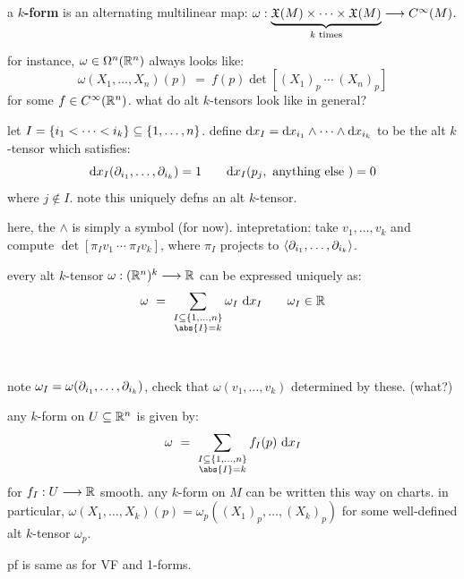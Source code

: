 \begin{defn}[title=Functional]
	a $k$\textbf{-form} is an alternating multilinear map:
	$\omega:\underbrace{\mathfrak{X}(M)\times\cdots\times\mathfrak{X}(M)}_{k \textrm{ times}}\longrightarrow C^{\infty}(M)$.
\end{defn}
for instance, $\omega\in\Omega^{n}(\mathbb{R}^{n})$ always looks like:
\begin{equation*}
	\omega(X_{1},\dots,X_{n})(p) \ = \ f(p)\det[(X_{1})_{p} \ \cdots \ (X_{n})_{p}]
\end{equation*}
for some $f\in C^{\infty}(\mathbb{R}^{n})$.
what do alt $k$-tensors look like in general?

\begin{defn}
	let $I=\left\{{i_{1}<\dots<i_{k}}\right\}\subseteq\left\{{1,\dots,n}\right\}$.
	define $\textrm{d} x_{I}=\textrm{d} x_{i_{1}}\wedge\cdots\wedge \textrm{d} x_{i_{k}}$
	to be the alt $k$-tensor which satisfies:
	\begin{equation*}
		\textrm{d} x_{I}(\partial_{i_{1}},\dots,\partial_{i_{k}}) = 1 \qquad
		\textrm{d} x_{I}(p_{j},\textrm{ anything else }) = 0
	\end{equation*}
	where $j\notin I$. note this uniquely defns an alt $k$-tensor.
\end{defn}
here, the $\wedge$ is simply a symbol (for now).
intepretation: take $v_{1},\dots,v_{k}$ and compute
$\det[\pi_{I}v_{1} \ \cdots \ \pi_{I}v_{k}]$, where $\pi_{I}$ projects
to $\left\langle{\partial_{i_{1}},\dots,\partial_{i_{k}}}\right\rangle$.

\begin{lm}[title=Coordinate-wise]
	every alt $k$-tensor $\omega:(\mathbb{R}^{n})^{k}\longrightarrow\mathbb{R}$ can be expressed
	uniquely as:
	\begin{equation*}
		\omega \ = \ \sum_{\substack{I\subseteq\set{1,\dots,n}\\\abs{I}=k}}\omega_{I}\di x_{I} \qquad
		\omega_{I}\in\bR
	\end{equation*} \vspace{-0.3in}
\end{lm} \

\begin{pf}
	note $\omega_{I}=\omega(\partial_{i_{1}},\dots,\partial_{i_{k}})$,
	check that $\omega(v_{1},\dots,v_{k})$ determined by these. (what?)
\end{pf}

\begin{prop}
	any $k$-form on $U\subseteq\mathbb{R}^{n}$ is given by:
	\begin{equation*}
		\omega \ = \ \sum_{\substack{I\subseteq\set{1,\dots,n}\\\abs{I}=k}}
		f_{I}(p)\di x_{I}
	\end{equation*}
	for $f_{I}:U\longrightarrow\mathbb{R}$ smooth.
	any $k$-form on $M$ can be written this way on charts.
	in particular, $\omega(X_{1},\dots,X_{k})(p)=\omega_{p}((X_{1})_{p},\dots,(X_{k})_{p})$
	for some well-defined alt $k$-tensor $\omega_{p}$.
\end{prop}
pf is same as for VF and 1-forms.

